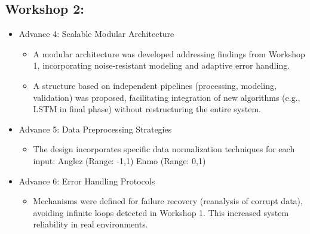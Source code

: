 \documentclass[conference]{IEEEtran}
\begin{document}
\subsection{Workshop 2:}
\begin{itemize}
    \item Advance 4: Scalable Modular Architecture
    \begin{itemize}
    \item A modular architecture was developed addressing findings from Workshop 1, incorporating noise-resistant modeling and adaptive error handling.
    
    \item A structure based on independent pipelines (processing, modeling, validation) was proposed, facilitating integration of new algorithms (e.g., LSTM in final phase) without restructuring the entire system.
    \end{itemize}
    
    \item Advance 5: Data Preprocessing Strategies
    \begin{itemize}
    \item The design incorporates specific data normalization techniques for each input: Anglez (Range: -1,1) Enmo (Range: 0,1)
    \end{itemize}
    
    \item Advance 6: Error Handling Protocols
    \begin{itemize}
    \item Mechanisms were defined for failure recovery (reanalysis of corrupt data), avoiding infinite loops detected in Workshop 1. This increased system reliability in real environments.
    \end{itemize}
\end{itemize}
\end{document}
